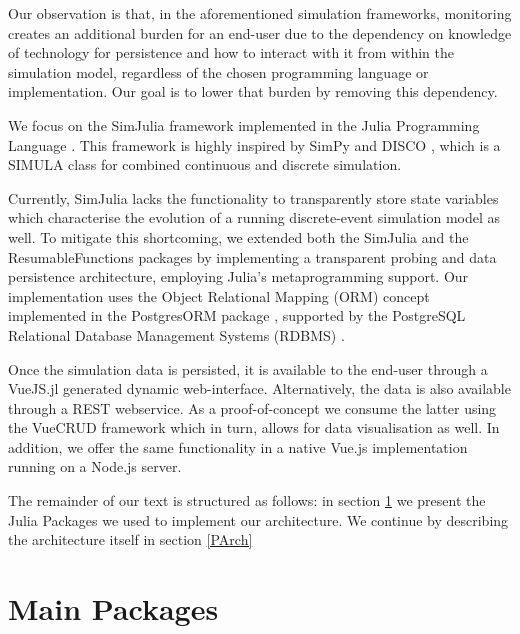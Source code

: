 \documentclass{juliacon}
\begin{document}
Our observation is that, in the aforementioned simulation frameworks, monitoring creates an additional burden for an end-user due to the dependency on knowledge of technology for persistence and how to interact with it from within the simulation model, regardless of the chosen programming language or implementation. Our goal is to lower that burden by removing this dependency. \vskip 6pt

We focus on the SimJulia \cite{lauwens2017simjulia} framework implemented in the Julia Programming Language \cite{bezanson2017julia}. This framework is highly inspired by SimPy and DISCO \cite{helsgaun1980disco}, which is a SIMULA \cite{DahlNygaard1966simula} class for combined continuous and discrete simulation.\vskip 6pt

Currently, SimJulia lacks the functionality to transparently store state variables which characterise the evolution of a running discrete-event simulation model as well. To mitigate this shortcoming, we extended both the SimJulia and the ResumableFunctions \cite{lauwens2017resumablefunctions} packages by implementing a transparent probing and data persistence architecture, employing Julia's metaprogramming support. Our implementation uses the Object Relational Mapping (ORM) concept \cite{russell2008bridging} implemented in the PostgresORM package \cite{tecnivelPostgresORM}, supported by the PostgreSQL Relational Database Management Systems (RDBMS) \cite{psqldocs}.\vskip 6pt

Once the simulation data is persisted, it is available to the end-user through a VueJS.jl \cite{vuejsjlAntonioLoureiro} generated dynamic web-interface. Alternatively, the data is also available through a REST \cite{fielding2000architectural} webservice. As a proof-of-concept we consume the latter using the VueCRUD \cite{masny2018vuecrud} framework which in turn, allows for data visualisation as well. In addition, we offer the same functionality in a native Vue.js \cite{binUzayr2019} implementation running on a Node.js \cite{nodejs} server.\vskip 6pt

The remainder of our text is structured as follows: in section \ref{MainPackages} we present the Julia Packages we used to implement our architecture. We continue by describing the architecture itself in section \ref{PArch}\vskip 6pt

\section{Main Packages}\label{MainPackages}
\end{document}
